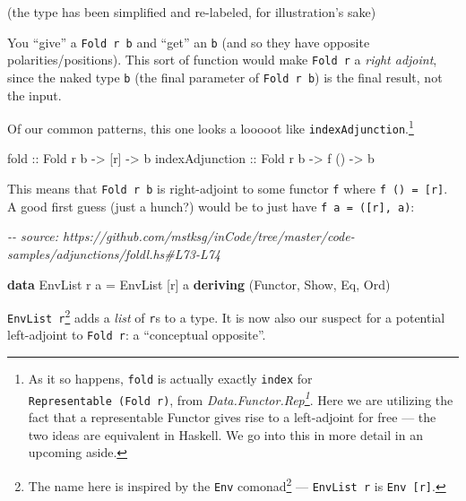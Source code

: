 \documentclass[]{article}
\newenvironment{Shaded}{}{}
\newcommand{\CommentTok}[1]{\textcolor[rgb]{0.38,0.63,0.69}{\textit{#1}}}
\newcommand{\DataTypeTok}[1]{\textcolor[rgb]{0.56,0.13,0.00}{#1}}
\newcommand{\KeywordTok}[1]{\textcolor[rgb]{0.00,0.44,0.13}{\textbf{#1}}}
\newcommand{\NormalTok}[1]{#1}
\newcommand{\OtherTok}[1]{\textcolor[rgb]{0.00,0.44,0.13}{#1}}
\renewcommand{\href}[2]{#2\footnote{\url{#1}}}
\begin{document}
(the type has been simplified and re-labeled, for illustration's sake)

You ``give'' a \texttt{Fold\ r\ b} and ``get'' an \texttt{b} (and so they have
opposite polarities/positions). This sort of function would make
\texttt{Fold\ r} a \emph{right adjoint}, since the naked type \texttt{b} (the
final parameter of \texttt{Fold\ r\ b}) is the final result, not the input.

Of our common patterns, this one looks a looooot like
\texttt{indexAdjunction}.\footnote{As it so happens, \texttt{fold} is actually
  exactly \texttt{index} for \texttt{Representable\ (Fold\ r)}, from
  \emph{\href{https://hackage.haskell.org/package/adjunctions/docs/Data-Functor-Rep.html}{Data.Functor.Rep}}.
  Here we are utilizing the fact that a representable Functor gives rise to a
  left-adjoint for free --- the two ideas are equivalent in Haskell. We go into
  this in more detail in an upcoming aside.}

\begin{Shaded}
\begin{Highlighting}[]
\OtherTok{fold            ::} \DataTypeTok{Fold}\NormalTok{ r b }\OtherTok{{-}\textgreater{}}\NormalTok{ [r]  }\OtherTok{{-}\textgreater{}}\NormalTok{ b}
\OtherTok{indexAdjunction ::} \DataTypeTok{Fold}\NormalTok{ r b }\OtherTok{{-}\textgreater{}}\NormalTok{ f () }\OtherTok{{-}\textgreater{}}\NormalTok{ b}
\end{Highlighting}
\end{Shaded}

This means that \texttt{Fold\ r\ b} is right-adjoint to some functor \texttt{f}
where \texttt{f\ ()\ =\ {[}r{]}}. A good first guess (just a hunch?) would be to
just have \texttt{f\ a\ =\ ({[}r{]},\ a)}:

\begin{Shaded}
\begin{Highlighting}[]
\CommentTok{{-}{-} source: https://github.com/mstksg/inCode/tree/master/code{-}samples/adjunctions/foldl.hs\#L73{-}L74}

\KeywordTok{data} \DataTypeTok{EnvList}\NormalTok{ r a }\OtherTok{=} \DataTypeTok{EnvList}\NormalTok{ [r] a}
  \KeywordTok{deriving}\NormalTok{ (}\DataTypeTok{Functor}\NormalTok{, }\DataTypeTok{Show}\NormalTok{, }\DataTypeTok{Eq}\NormalTok{, }\DataTypeTok{Ord}\NormalTok{)}
\end{Highlighting}
\end{Shaded}

\texttt{EnvList\ r}\footnote{The name here is inspired by the
  \href{https://hackage.haskell.org/package/comonad/docs/Control-Comonad-Trans-Env.html}{\texttt{Env}
  comonad} --- \texttt{EnvList\ r} is \texttt{Env\ {[}r{]}}.} adds a \emph{list}
of \texttt{r}s to a type. It is now also our suspect for a potential
left-adjoint to \texttt{Fold\ r}: a ``conceptual opposite''.
\end{document}
